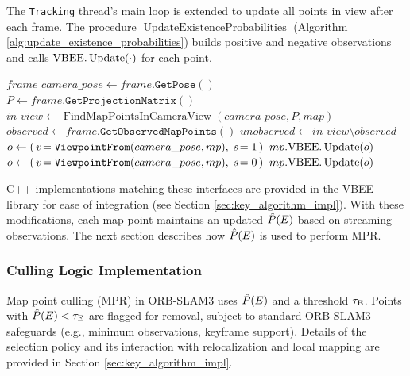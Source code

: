 The \texttt{Tracking} thread’s main loop is extended to update all points in view after each frame. The procedure \(\operatorname{UpdateExistenceProbabilities}\) (Algorithm \ref{alg:update_existence_probabilities}) builds positive and negative observations and calls \(\text{VBEE}.\operatorname{Update}(\cdot)\) for each point.

\begin{singlespace}
\begin{algorithm}[H]
    \caption[Update Existence Probabilities]{$\operatorname{UpdateExistenceProbabilities}$}
    \label{alg:update_existence_probabilities}
    \begin{algorithmic}
        \Require $frame$ 
            \State $camera\_pose \gets frame.\texttt{GetPose}()$
            \State $P \gets frame.\texttt{GetProjectionMatrix}()$
            \State $in\_view \gets \operatorname{FindMapPointsInCameraView}(camera\_pose, P, map)$
            \State $observed \gets frame.\texttt{GetObservedMapPoints}()$ 
            \State $unobserved \gets in\_view \setminus observed$ 
                \State $o \gets (\,v\!=\texttt{ViewpointFrom}(camera\_pose, mp),\; s\!=1\,)$
                \State $mp.\text{VBEE}.\operatorname{Update}(o)$
            \EndFor
                \State $o \gets (\,v\!=\texttt{ViewpointFrom}(camera\_pose, mp),\; s\!=0\,)$
                \State $mp.\text{VBEE}.\operatorname{Update}(o)$
            \EndFor
        \EndFunction
    \end{algorithmic}
\end{algorithm}
\end{singlespace}

C++ implementations matching these interfaces are provided in the VBEE library for ease of integration (see Section \ref{sec:key_algorithm_impl}). With these modifications, each map point maintains an updated \(\hat{P}(E)\) based on streaming observations. The next section describes how \(\hat{P}(E)\) is used to perform MPR.

\subsubsection{Culling Logic Implementation}
\label{sec:orb_slam3_culling_logic}

Map point culling (MPR) in ORB-SLAM3 uses \(\hat{P}(E)\) and a threshold \(\tau_{\text{E}}\). Points with \(\hat{P}(E) < \tau_{\text{E}}\) are flagged for removal, subject to standard ORB-SLAM3 safeguards (e.g., minimum observations, keyframe support). Details of the selection policy and its interaction with relocalization and local mapping are provided in Section \ref{sec:key_algorithm_impl}.

